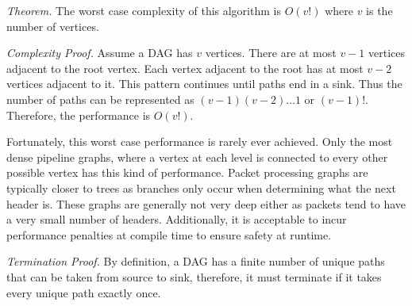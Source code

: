\textit{Theorem.} The worst case complexity of this algorithm is $O(v!)$ where $v$ is the number of vertices.

\textit{Complexity Proof.}  Assume a DAG has $v$ vertices. There are at most $v-1$ vertices adjacent to the root vertex. Each vertex adjacent to the root has at most $v-2$ vertices adjacent to it. This pattern continues until paths end in a sink. Thus the number of paths can be represented as $(v-1)(v-2)...1$ or $(v-1)!$. Therefore, the performance
is $O(v!)$.

Fortunately, this worst case performance is rarely ever achieved. Only the most dense pipeline graphs, where a vertex at each level is connected to every other possible vertex has this kind of performance. Packet processing graphs are typically closer to trees as branches only occur when determining what the next header is. These graphs are generally not very deep either as packets tend to have a very small number of headers.
Additionally, it is acceptable to incur performance penalties at compile time
to ensure safety at runtime.

\textit{Termination Proof.} By definition, a DAG has a finite number of unique paths that can be taken from source to sink, therefore, it must terminate if it takes every unique path exactly once.
%
%

